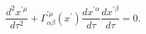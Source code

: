 \begin{equation}
\frac{d^{2}x^{\prime\mu}}{d\tau^{2}}+\Gamma_{\alpha\beta}^{\prime\mu
}(x^{\prime})\frac{dx^{\prime\alpha}}{d\tau}\frac{dx^{\prime\beta}}{d\tau}=0.
\label{3}
\end{equation}

